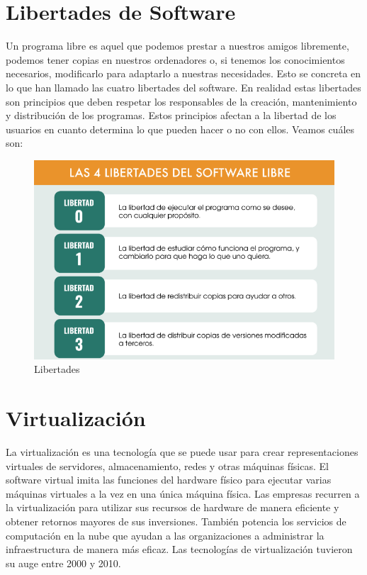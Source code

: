 \documentclass[11pt,twoside]{book}
\begin{document}
\section{Libertades de Software} 

Un programa libre es aquel que podemos prestar a nuestros amigos libremente, podemos tener copias en nuestros ordenadores o, si tenemos los conocimientos necesarios, modificarlo para adaptarlo a nuestras necesidades. Esto se concreta en lo que han llamado las cuatro libertades del software. En realidad estas libertades son principios que deben respetar los responsables de la creación, mantenimiento y distribución de los programas. Estos principios afectan a la libertad de los usuarios en cuanto determina lo que pueden hacer o no con ellos. Veamos cuáles son:

\begin{figure}[htb]
  \centering
  \includegraphics[width=1\linewidth, height=1
  \textheight]{libertades.png}
  \caption{Libertades}
  \label{fig:etiqueta}
\end{figure}

\section{Virtualización}

La virtualización es una tecnología que se puede usar para crear representaciones virtuales de servidores, almacenamiento, redes y otras máquinas físicas. El software virtual imita las funciones del hardware físico para ejecutar varias máquinas virtuales a la vez en una única máquina física. Las empresas recurren a la virtualización para utilizar sus recursos de hardware de manera eficiente y obtener retornos mayores de sus inversiones. También potencia los servicios de computación en la nube que ayudan a las organizaciones a administrar la infraestructura de manera más eficaz. Las tecnologías de virtualización tuvieron su auge entre 2000 y 2010.
\end{document}
